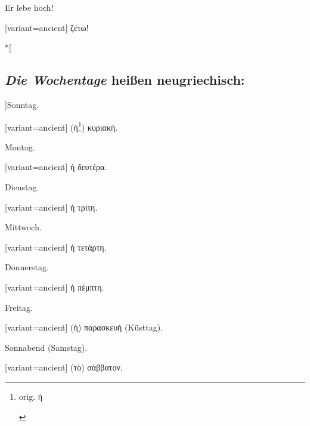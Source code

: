 Er lebe hoch!

\switchcolumn

\begin{greek}[variant=ancient]%
ζέτω!

\end{greek}%
\switchcolumn[0]*[


\subsection*{\emph{Die Wochentage} heißen neugriechisch:}

]Sonntag.

\switchcolumn

\begin{greek}[variant=ancient]%
(ἡ\footnote{\begin{latin}%
orig. \textgreek[variant=ancient]{ὴ}\end{latin}%
}) κυριακή.

\end{greek}%
\switchcolumn*

Montag.

\switchcolumn

\begin{greek}[variant=ancient]%
ἡ δευτέρα.

\end{greek}%
\switchcolumn*

Dienstag.

\switchcolumn

\begin{greek}[variant=ancient]%
ἡ τρίτη.

\end{greek}%
\switchcolumn*

Mittwoch.

\switchcolumn

\begin{greek}[variant=ancient]%
ἡ τετάρτη.

\end{greek}%
\switchcolumn*

Donners\textcompwordmark{}tag.

\switchcolumn

\begin{greek}[variant=ancient]%
ἡ πέμπτη.

\end{greek}%
\switchcolumn*

Freitag.

\switchcolumn

\begin{greek}[variant=ancient]%
(ἡ) παρασκευή \textgerman[spelling=old,babelshorthands=true]{(Küst\textcompwordmark{}tag)}.

\end{greek}%
\switchcolumn*

Sonnabend (Samstag).

\switchcolumn

\begin{greek}[variant=ancient]%
(τὸ) σάββατον.

\end{greek}%
